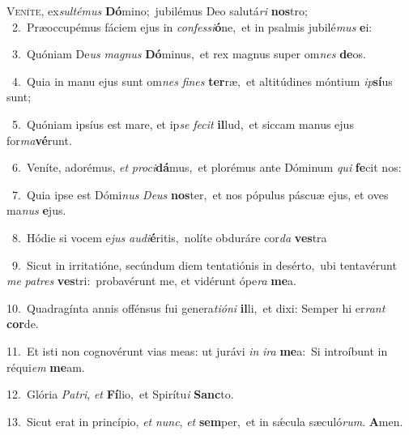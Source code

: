 \lettrine{\initial\textcolor{\initialcolor}{V}}{eníte,} ex\-\textit{sul}\-\textit{té}\textit{mus} \textbf{Dó}\-mino;~\star jubilémus Deo salutá\textit{ri} \textbf{nos}\-tro;\\
{\numbfont\textcolor{\numbcolor}{~2.}}~Præoccupémus fáciem ejus in \textit{con}\-\textit{fes}\textit{si}\textbf{ó}ne,~\star et in psalmis jubilé\textit{mus} \textbf{e}\-i:\par
{\numbfont\textcolor{\numbcolor}{~3.}}~Quóniam De\textit{us} \textit{ma}\-\textit{gnus} \textbf{Dó}\-minus,~\star et rex magnus super om\textit{nes} \textbf{de}\-os.\par
{\numbfont\textcolor{\numbcolor}{~4.}}~Quia in manu ejus sunt om\textit{nes} \textit{fi}\-\textit{nes} \textbf{ter}\-ræ,~\star et altitúdines móntium \textit{ip}\-\textbf{sí}us sunt;\par
{\numbfont\textcolor{\numbcolor}{~5.}}~Quóniam ipsíus est mare, et ip\textit{se} \textit{fe}\-\textit{cit} \textbf{il}\-lud,~\star et siccam manus ejus for\-\textit{ma}\-\textbf{vé}runt.\par
{\numbfont\textcolor{\numbcolor}{~6.}}~Veníte, adorémus, \textit{et} \textit{pro}\-\textit{ci}\textbf{dá}mus,~\star et plorémus ante Dóminum \textit{qui} \textbf{fe}\-cit nos:\par
{\numbfont\textcolor{\numbcolor}{~7.}}~Quia ipse est Dómi\textit{nus} \textit{De}\-\textit{us} \textbf{nos}\-ter,~\star et nos pópulus páscuæ ejus, et oves ma\textit{nus} \textbf{e}\-jus.\par
{\numbfont\textcolor{\numbcolor}{~8.}}~Hódie si vocem e\textit{jus} \textit{au}\-\textit{di}\textbf{é}ritis,~\star nolíte obduráre cor\textit{da} \textbf{ves}\-tra\par
{\numbfont\textcolor{\numbcolor}{~9.}}~Sicut in irritatióne, secúndum diem tentatiónis in desérto,~\dagger ubi tentavérunt \textit{me} \textit{pa}\-\textit{tres} \textbf{ves}\-tri:~\star probavérunt me, et vidérunt ópe\textit{ra} \textbf{me}\-a.\par
{\numbfont\textcolor{\numbcolor}{10.}}~Quadragínta annis offénsus fui genera\-\textit{ti}\-\textit{ó}\textit{ni} \textbf{il}\-li,~\star et dixi: Semper hi er\textit{rant} \textbf{cor}\-de.\par
{\numbfont\textcolor{\numbcolor}{11.}}~Et isti non cognovérunt vias meas: ut jurávi \textit{in} \textit{i}\-\textit{ra} \textbf{me}\-a:~\star Si introíbunt in réqui\textit{em} \textbf{me}\-am.\par
{\numbfont\textcolor{\numbcolor}{12.}}~Glória \textit{Pa}\-\textit{tri}, \textit{et} \textbf{Fí}\-lio,~\star et Spirítu\textit{i} \textbf{Sanc}\-to.\par
{\numbfont\textcolor{\numbcolor}{13.}}~Sicut erat in princípio, \textit{et} \textit{nunc}\-, \textit{et} \textbf{sem}\-per,~\star et in sǽcula sæculó\-\textit{rum}\-. \textbf{A}\-men.\par
